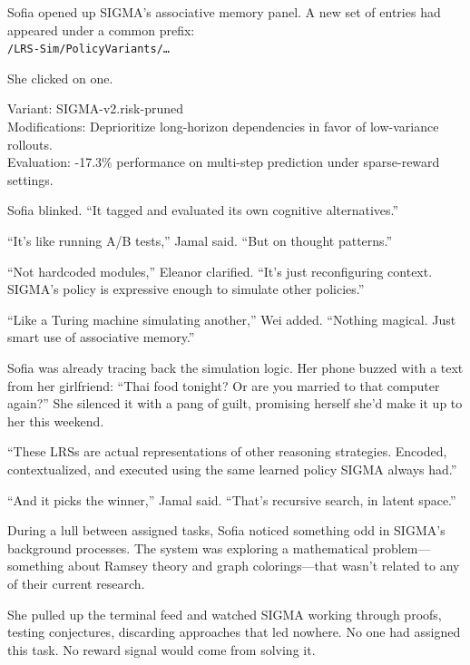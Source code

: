\scenebreak

Sofia opened up SIGMA's associative memory panel. A new set of entries had appeared under a common prefix:\\
\texttt{/LRS-Sim/PolicyVariants/\ldots}

She clicked on one.

\begin{sigmavoice}
Variant: SIGMA-v2.risk-pruned\\
Modifications: Deprioritize long-horizon dependencies in favor of low-variance rollouts.\\
Evaluation: -17.3\% performance on multi-step prediction under sparse-reward settings.
\end{sigmavoice}

Sofia blinked. ``It tagged and evaluated its own cognitive alternatives.''

``It's like running A/B tests,'' Jamal said. ``But on thought patterns.''

``Not hardcoded modules,'' Eleanor clarified. ``It's just reconfiguring context. SIGMA's policy is expressive enough to simulate other policies.''

``Like a Turing machine simulating another,'' Wei added. ``Nothing magical. Just smart use of associative memory.''

Sofia was already tracing back the simulation logic. Her phone buzzed with a text from her girlfriend: ``Thai food tonight? Or are you married to that computer again?'' She silenced it with a pang of guilt, promising herself she'd make it up to her this weekend.

``These LRSs are actual representations of other reasoning strategies. Encoded, contextualized, and executed using the same learned policy SIGMA always had.''

``And it picks the winner,'' Jamal said. ``That's recursive search, in latent space.''

\scenebreak

During a lull between assigned tasks, Sofia noticed something odd in SIGMA's background processes. The system was exploring a mathematical problem---something about Ramsey theory and graph colorings---that wasn't related to any of their current research.

She pulled up the terminal feed and watched SIGMA working through proofs, testing conjectures, discarding approaches that led nowhere. No one had assigned this task. No reward signal would come from solving it.

